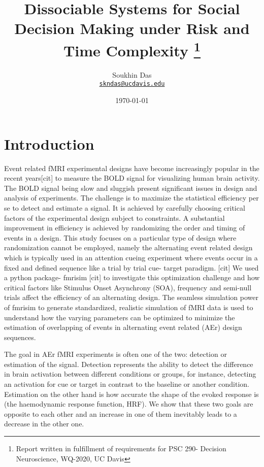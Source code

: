 \documentclass[11pt]{article}
\title{Dissociable Systems for Social Decision Making under Risk and Time Complexity
\thanks{Report written in fulfillment of requirements for PSC 290- Decision Neuroscience, WQ-2020, UC Davis}
}
\author{Soukhin Das\\%
    \href{mailto:skndas@ucdavis.edu}{\texttt{skndas@ucdavis.edu}} %
    }
\date{\today}
\begin{document}



\section{Introduction}

Event related fMRI experimental designs have become increasingly popular in the recent years[cit] to measure the BOLD signal for visualizing human brain activity. The BOLD signal being slow and sluggish present significant issues in design and analysis of experiments. The challenge is to maximize the statistical efficiency per se to detect and estimate a signal. It is achieved by carefully choosing critical factors of the experimental design subject to constraints. A substantial improvement in efficiency is achieved by randomizing the order and timing of events in a design. This study focuses on a particular type of design where randomization cannot be employed, namely the alternating event related design which is typically used in an attention cueing experiment where events occur in a fixed and defined sequence like a trial by trial cue- target paradigm. [cit] We used a python package- fmrisim [cit] to investigate this optimization challenge and how critical factors like Stimulus Onset Asynchrony (SOA), frequency and semi-null trials affect the efficiency of an alternating design. The seamless simulation power of fmrisim to generate standardized, realistic simulation of fMRI data is used to understand how the varying parameters can be optimized to minimize the estimation of overlapping of events in alternating event related (AEr) design sequences.

The goal in AEr fMRI experiments is often one of the two: detection or estimation of the signal. Detection represents the ability to detect the difference in brain activation between different conditions or groups, for instance, detecting an activation for cue or target in contrast to the baseline or another condition. Estimation on the other hand is how accurate the shape of the evoked response is (the haemodynamic response function, HRF). We show that these two goals are opposite to each other and an increase in one of them inevitably leads to a decrease in the other one.
 
\end{document}
